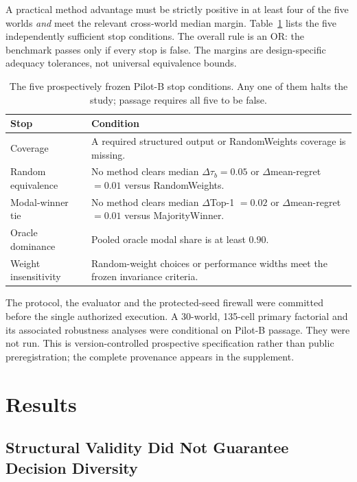 \documentclass[runningheads,orivec]{llncs}
\begin{document}
A practical method advantage must be strictly positive in at least four of the five
worlds \emph{and} meet the relevant cross-world median margin.
Table~\ref{tab:gates} lists the five independently sufficient stop conditions. The
overall rule is an OR: the benchmark passes only if every stop is false. The margins
are design-specific adequacy tolerances, not universal equivalence bounds.

\begin{table}[t]
\centering
\caption{The five prospectively frozen Pilot-B stop conditions. Any one of them halts
the study; passage requires all five to be false.}
\label{tab:gates}
\small
\begin{tabularx}{\linewidth}{@{}l X@{}}
\toprule
\textbf{Stop} & \textbf{Condition}\\
\midrule
Coverage & A required structured output or RandomWeights coverage is missing.\\
Random equivalence & No method clears median $\Delta\tau_b=0.05$ or
$\Delta$mean-regret $=0.01$ versus RandomWeights.\\
Modal-winner tie & No method clears median $\Delta$Top-1 $=0.02$ or
$\Delta$mean-regret $=0.01$ versus MajorityWinner.\\
Oracle dominance & Pooled oracle modal share is at least $0.90$.\\
Weight insensitivity & Random-weight choices or performance widths meet the frozen
invariance criteria.\\
\bottomrule
\end{tabularx}
\end{table}

The protocol, the evaluator and the protected-seed firewall were committed before the
single authorized execution. A 30-world, 135-cell primary factorial and its associated
robustness analyses were conditional on Pilot-B passage. They were not run. This is
version-controlled prospective specification rather than public preregistration; the
complete provenance appears in the supplement.

\section{Results}
\label{sec:results}

\subsection{Structural Validity Did Not Guarantee Decision Diversity}
\label{sec:structural}
\end{document}
